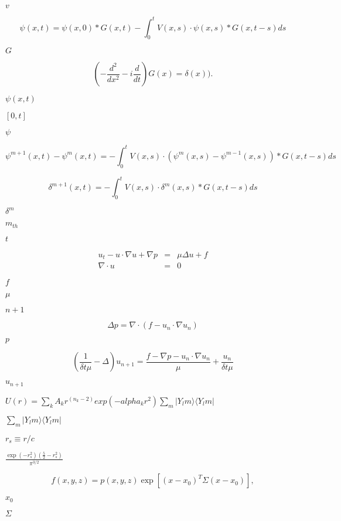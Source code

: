 \documentclass{article}
\begin{document}
$ v $
\pagebreak

\[
    \psi(x,t) = \psi(x,0) * G(x,t) - \int_0^t V(x,s) \cdot \psi(x,s) * G(x,t-s) ds
 \]
\pagebreak

$ G $
\pagebreak

\[
    \left( - \frac{d^2}{dx^2} - i \frac{d}{dt} \right) G(x) = \delta(x)).
 \]
\pagebreak

$ \psi(x,t) $
\pagebreak

$ [0,t] $
\pagebreak

$ \psi $
\pagebreak

\[
    \psi^{m+1}(x,t) - \psi^{m}(x,t) = - \int_0^t V(x,s) \cdot ( \psi^{m}(x,s) - \psi^{m-1}(x,s)) * G(x,t-s) ds
\]
\pagebreak

\[
    \delta^{m+1}(x,t) = - \int_0^t V(x,s) \cdot  \delta^{m}(x,s) * G(x,t-s) ds
\]
\pagebreak

$ \delta^m $
\pagebreak

$ m_{th} $
\pagebreak

$t$
\pagebreak

\begin{eqnarray*}
u_t - u \cdot \nabla u + \nabla p & = &\mu \Delta u + f \\
\nabla \cdot u & = & 0
\end{eqnarray*}
\pagebreak

$ f $
\pagebreak

$ \mu $
\pagebreak

$ n+1 $
\pagebreak

\[
  \Delta p = \nabla \cdot (f - u_{n} \cdot \nabla u_{n} )
  \]
\pagebreak

$p$
\pagebreak

\[
  (\frac{1}{ \delta t \mu } - \Delta) u_{n+1} = \frac {f - \nabla p - u_n \cdot \nabla u_n }{ \mu } + \frac {u_n}{ \delta t \mu }
  \]
\pagebreak

$u_{n+1}$
\pagebreak

$  U(r) = \sum_k A_k r^(n_k-2) exp(-alpha_k r^2) \sum_m |Y_lm \rangle \langle Y_lm| $
\pagebreak

$\sum_m |Y_lm \rangle \langle Y_lm|$
\pagebreak

$ r_s \equiv r/c $
\pagebreak

$ \frac{\exp(-r_s^2) \left(\frac{5}{2}- r_s^2 \right)}{\pi^{3/2}} $
\pagebreak

\[
f(x,y,z) = p(x,y,z) \exp[(x-x_0)^T \Sigma (x-x_0)],
\]
\pagebreak

$x_0$
\pagebreak

$\Sigma$
\pagebreak
\end{document}
